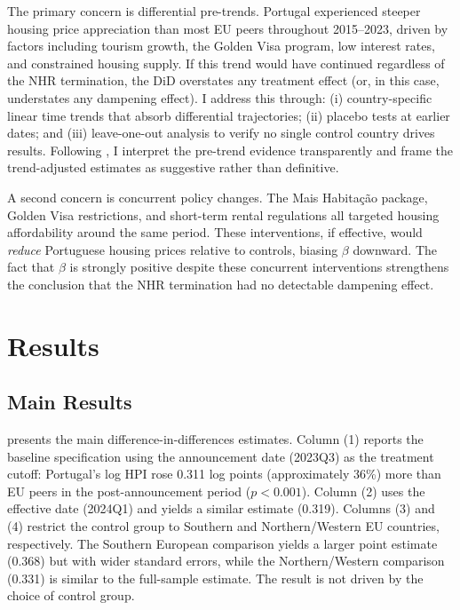 \documentclass[12pt]{article}
\begin{document}
The primary concern is differential pre-trends. Portugal experienced steeper housing price appreciation than most EU peers throughout 2015--2023, driven by factors including tourism growth, the Golden Visa program, low interest rates, and constrained housing supply. If this trend would have continued regardless of the NHR termination, the DiD overstates any treatment effect (or, in this case, understates any dampening effect). I address this through: (i) country-specific linear time trends that absorb differential trajectories; (ii) placebo tests at earlier dates; and (iii) leave-one-out analysis to verify no single control country drives results. Following \citet{roth2023pretest}, I interpret the pre-trend evidence transparently and frame the trend-adjusted estimates as suggestive rather than definitive.

A second concern is concurrent policy changes. The Mais Habita\c{c}\~{a}o package, Golden Visa restrictions, and short-term rental regulations all targeted housing affordability around the same period. These interventions, if effective, would \emph{reduce} Portuguese housing prices relative to controls, biasing $\beta$ downward. The fact that $\beta$ is strongly positive despite these concurrent interventions strengthens the conclusion that the NHR termination had no detectable dampening effect.


\section{Results}

\subsection{Main Results}



 presents the main difference-in-differences estimates. Column (1) reports the baseline specification using the announcement date (2023Q3) as the treatment cutoff: Portugal's log HPI rose 0.311 log points (approximately 36\%) more than EU peers in the post-announcement period ($p < 0.001$). Column (2) uses the effective date (2024Q1) and yields a similar estimate (0.319). Columns (3) and (4) restrict the control group to Southern and Northern/Western EU countries, respectively. The Southern European comparison yields a larger point estimate (0.368) but with wider standard errors, while the Northern/Western comparison (0.331) is similar to the full-sample estimate. The result is not driven by the choice of control group.
\end{document}
